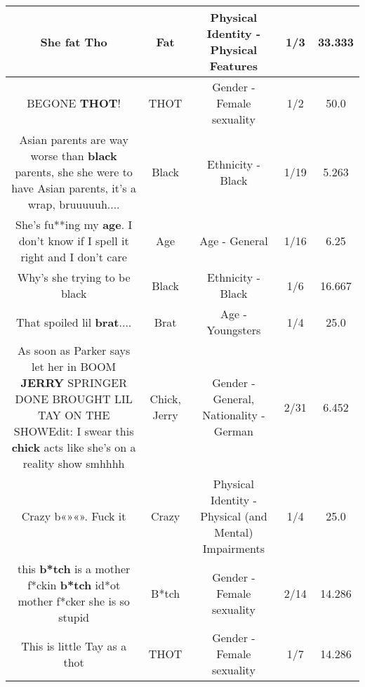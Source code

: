 \documentclass[11pt]{article}
\newlength\mylength
\begin{document}
\begin{center}
\begin{longtable}{|C{.65\mylength}|C{.30\mylength}|C{.12\mylength}|C{.12\mylength}|C{.12\mylength}|}
  \small She \textbf{fat} Tho\normalsize   & Fat & Physical Identity - Physical Features & 1/3 & 33.333 \\  \hline
  \small BEGONE \textbf{THOT}!\normalsize   & THOT & Gender - Female sexuality & 1/2 & 50.0 \\  \hline
  \small Asian parents are way worse than \textbf{black} parents, she she were to have Asian parents, it's a wrap, bruuuuuh....\normalsize   & Black & Ethnicity - Black & 1/19 & 5.263 \\  \hline
  \small She's fu**ing my \textbf{age}. I don't know if I spell it right and I don't care\normalsize   & Age & Age - General & 1/16 & 6.25 \\  \hline
  \small Why's she trying to be black\normalsize   & Black & Ethnicity - Black & 1/6 & 16.667 \\  \hline
  \small That spoiled lil \textbf{brat}....\normalsize   & Brat & Age - Youngsters & 1/4 & 25.0 \\  \hline
  \small As soon as Parker says let her in BOOM \textbf{JERRY} SPRINGER DONE BROUGHT LIL TAY ON THE SHOWEdit: I swear this \textbf{chick} acts like she's on a reality show smhhhh\normalsize   & Chick, Jerry & Gender - General, Nationality - German & 2/31 & 6.452 \\  \hline
  \small Crazy b«»«». Fuck it\normalsize   & Crazy & Physical Identity - Physical (and Mental) Impairments & 1/4 & 25.0 \\  \hline
  \small this \textbf{b*tch} is a mother f*ckin \textbf{b*tch} id*ot mother f*cker she is so stupid\normalsize   & B*tch & Gender - Female sexuality & 2/14 & 14.286 \\  \hline
  \small This is little Tay as a thot\normalsize   & THOT & Gender - Female sexuality & 1/7 & 14.286 \\  \hline

\end{longtable}
\end{center}
\end{document}
